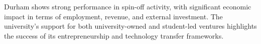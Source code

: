\documentclass[journal,onecolumn, 10pt,draftclsnofoot]{IEEEtran}
\begin{document}
Durham shows strong performance in spin-off activity, with significant economic impact in terms of employment, revenue, and external investment. The university's support for both university-owned and student-led ventures highlights the success of its entrepreneurship and technology transfer frameworks.

\end{document}

